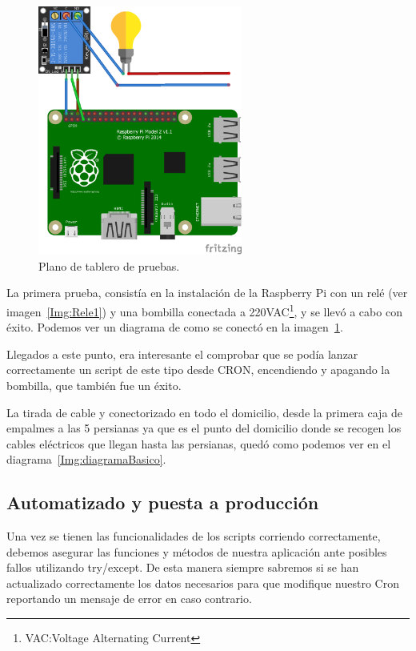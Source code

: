 \begin{figure}
    \centering
    \includegraphics[width=0.6\textwidth]{img/Plano_Placa_Pruebas.png}
    \caption{Plano de tablero de pruebas.} \label{Img:Plano_Placa_Pruebas}
\end{figure}

La primera prueba, consistía en la instalación de la Raspberry Pi con un relé (ver imagen~\ref{Img:Rele1}) y una bombilla conectada a 220VAC\footnote{VAC:Voltage Alternating Current}, y se llevó a cabo con éxito. Podemos ver un diagrama de como se conectó en la imagen~\ref{Img:Plano_Placa_Pruebas}.

Llegados a este punto, era interesante el comprobar que se podía lanzar correctamente un script de este tipo desde CRON, encendiendo y apagando la bombilla, que también fue un éxito.

La tirada de cable y conectorizado en todo el domicilio, desde la primera caja de empalmes a las 5 persianas ya que es el punto del domicilio donde se recogen los cables eléctricos que llegan hasta las persianas, quedó como podemos ver en el diagrama~\ref{Img:diagramaBasico}. 

\subsection{Automatizado y puesta a producción}
Una vez se tienen las funcionalidades de los scripts corriendo correctamente, debemos asegurar las funciones y métodos de nuestra aplicación ante posibles fallos utilizando try/except. De esta manera siempre sabremos si se han actualizado correctamente los datos necesarios para que modifique nuestro Cron reportando un mensaje de error en caso contrario.

